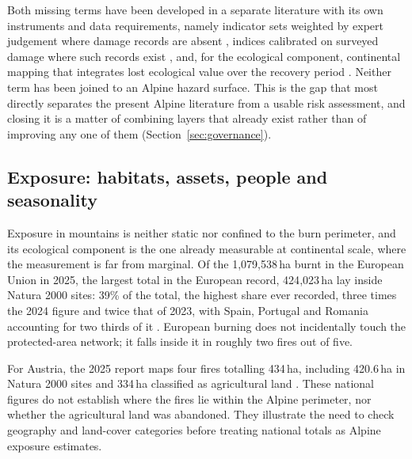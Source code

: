 \documentclass[11pt,a4paper]{article}
\begin{document}
Both missing terms have been developed in a separate literature with its own instruments and data requirements, namely indicator sets weighted by expert judgement where damage records are absent \citep{papathomakohle_towards_2025}, indices calibrated on surveyed damage where such records exist \citep{papathomakohle_wildfire_2022}, and, for the ecological component, continental mapping that integrates lost ecological value over the recovery period \citep{arrogantefunes_mapping_2024}. Neither term has been joined to an Alpine hazard surface. This is the gap that most directly separates the present Alpine literature from a usable risk assessment, and closing it is a matter of combining layers that already exist rather than of improving any one of them (Section~\ref{sec:governance}).

\subsection{Exposure: habitats, assets, people and seasonality}

Exposure in mountains is neither static nor confined to the burn perimeter, and its ecological component is the one already measurable at continental scale, where the measurement is far from marginal. Of the 1{,}079{,}538\,ha burnt in the European Union in 2025, the largest total in the European record, 424{,}023\,ha lay inside Natura 2000 sites: 39\% of the total, the highest share ever recorded, three times the 2024 figure and twice that of 2023, with Spain, Portugal and Romania accounting for two thirds of it \citep{jrc_advance_2026}. European burning does not incidentally touch the protected-area network; it falls inside it in roughly two fires out of five.

For Austria, the 2025 report maps four fires totalling 434\,ha, including 420.6\,ha in Natura 2000 sites and 334\,ha classified as agricultural land \citep{jrc_advance_2026}. These national figures do not establish where the fires lie within the Alpine perimeter, nor whether the agricultural land was abandoned. They illustrate the need to check geography and land-cover categories before treating national totals as Alpine exposure estimates.
\end{document}
